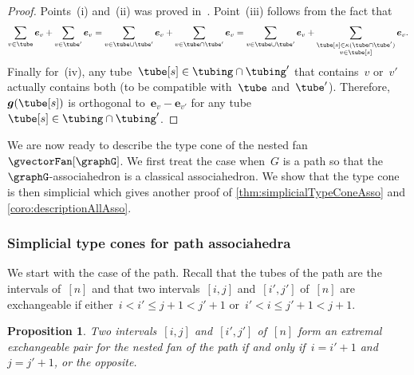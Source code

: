 \documentclass{amsart}
\newtheorem{proposition}[theorem]{Proposition}
\theoremstyle{definition}
\renewcommand{\b}[1]{{\boldsymbol{#1}}} %
\newcommand{\gvector}[1]{\b{g}(#1)} %
\newcommand{\connectedComponents}{\kappa} %
\begin{document}
\begin{proof}
Points~(i) and~(ii) was proved in~\cite{MannevillePilaud-compatibilityFans}. Point~(iii) follows from the fact that
\[
\sum_{v \in \tube} \b{e}_v + \sum_{v \in \tube'} \b{e}_v = \sum_{v \in \tube \cup \tube'} \b{e}_v + \sum_{v \in \tube \cap \tube'} \b{e}_v = \sum_{v \in \tube \cup \tube'} \b{e}_v + \sum_{\substack{\tube[s] \in \connectedComponents(\tube \cap \tube') \\ v \in \tube[s]}} \b{e}_v.
\]
Finally for~(iv), any tube~$\tube[s] \in \tubing \cap \tubing'$ that contains~$v$ or~$v'$ actually contains both (to be compatible with~$\tube$ and~$\tube'$). Therefore, $\gvector{\tube[s]}$ is orthogonal to~$\b{e}_v - \b{e}_{v'}$ for any tube~$\tube[s] \in \tubing \cap \tubing'$.
\end{proof}

We are now ready to describe the type cone of the nested fan~$\gvectorFan[\graphG]$.
We first treat the case when~$G$ is a path so that the $\graphG$-associahedron is a classical associahedron.
We show that the type cone is then simplicial which gives another proof of \cref{thm:simplicialTypeConeAsso} and \cref{coro:descriptionAllAsso}.

\subsubsection{Simplicial type cones for path associahedra}

We start with the case of the path.
Recall that the tubes of the path are the intervals of~$[n]$ and that two intervals~$[i,j]$ and~$[i',j']$ of~$[n]$ are exchangeable if either~${i < i' \le j+1 < j'+1}$ or~${i' < i \le j'+1 < j+1}$.

\begin{proposition}
\label{prop:extremalExchangeablePairsA}
Two intervals~$[i,j]$ and~$[i',j']$ of~$[n]$ form an extremal exchangeable pair for the nested fan of the path if and only if~$i = i'+1$ and~$j = j'+1$, or the opposite.
\end{proposition}
\end{document}
